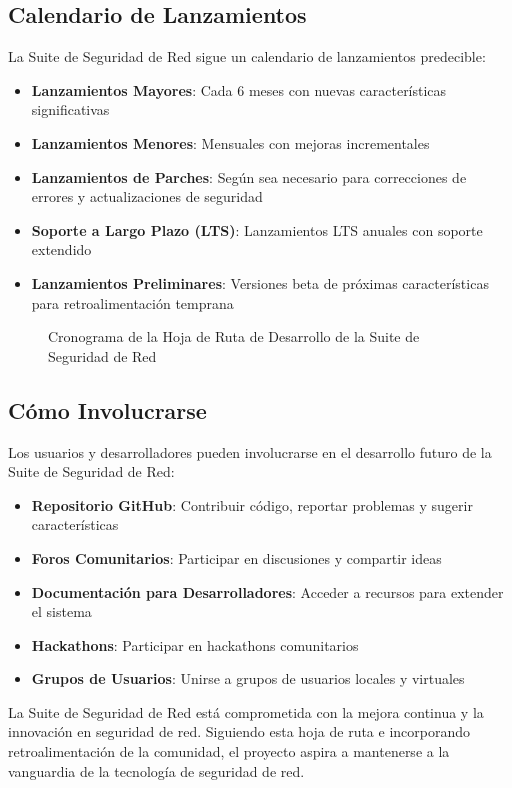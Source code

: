 \subsection{Calendario de Lanzamientos}
La Suite de Seguridad de Red sigue un calendario de lanzamientos predecible:

\begin{itemize}
    \item \textbf{Lanzamientos Mayores}: Cada 6 meses con nuevas características significativas
    \item \textbf{Lanzamientos Menores}: Mensuales con mejoras incrementales
    \item \textbf{Lanzamientos de Parches}: Según sea necesario para correcciones de errores y actualizaciones de seguridad
    \item \textbf{Soporte a Largo Plazo (LTS)}: Lanzamientos LTS anuales con soporte extendido
    \item \textbf{Lanzamientos Preliminares}: Versiones beta de próximas características para retroalimentación temprana
\end{itemize}

\begin{figure}[H]
    \centering
    \caption{Cronograma de la Hoja de Ruta de Desarrollo de la Suite de Seguridad de Red}
    \label{fig:roadmap}
\end{figure}

\subsection{Cómo Involucrarse}
Los usuarios y desarrolladores pueden involucrarse en el desarrollo futuro de la Suite de Seguridad de Red:

\begin{itemize}
    \item \textbf{Repositorio GitHub}: Contribuir código, reportar problemas y sugerir características
    \item \textbf{Foros Comunitarios}: Participar en discusiones y compartir ideas
    \item \textbf{Documentación para Desarrolladores}: Acceder a recursos para extender el sistema
    \item \textbf{Hackathons}: Participar en hackathons comunitarios
    \item \textbf{Grupos de Usuarios}: Unirse a grupos de usuarios locales y virtuales
\end{itemize}

La Suite de Seguridad de Red está comprometida con la mejora continua y la innovación en seguridad de red. Siguiendo esta hoja de ruta e incorporando retroalimentación de la comunidad, el proyecto aspira a mantenerse a la vanguardia de la tecnología de seguridad de red.